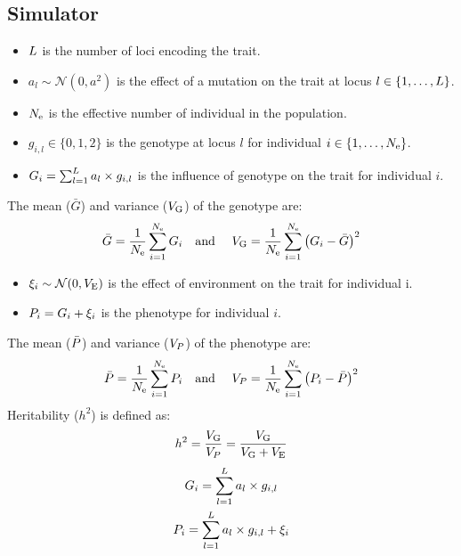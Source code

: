 \documentclass{article}
\begin{document}
\subsection{Simulator}
\begin{itemize}
    \setlength\itemsep{-0.2em}
    \item $L$ is the number of loci encoding the trait.
    \item $a_l \sim \mathcal{N}(0,a^2)$ is the effect of a mutation on the trait at locus $l \in \{1, \hdots, L\}$.
    \item $N_{\text{e}}$ is the effective number of individual in the population.
    \item $g_{i,l} \in \{0, 1, 2\}$ is the genotype at locus $l$ for individual $i \in \{1, \hdots, N_{\text{e}}\}$.
    \item $G_i = \sum_{l=1}^{L} a_l \times g_{i,l}$ is the influence of genotype on the trait for individual $i$.
\end{itemize}
The mean ($\bar{G}$) and variance ($V_{\mathrm{G}}$) of the genotype are:
\begin{equation}
    \bar{G} = \frac{1}{N_{\text{e}}}\sum_{i=1}^{N_{\text{e}}} G_i  \text{\quad and \quad}	V_{\mathrm{G}} = \frac{1}{N_{\text{e}}}\sum_{i=1}^{N_{\text{e}}}\left(G_i - \bar{G} \right)^2
\end{equation}
\begin{itemize}
    \setlength\itemsep{-0.2em}
    \item $\xi_i \sim \mathcal{N}(0, V_{\mathrm{E}})$ is the effect of environment on the trait for individual i.
    \item $P_i = G_i + \xi_i$ is the phenotype for individual $i$.
\end{itemize}
The mean ($\bar{P}$) and variance ($V_{P}$) of the phenotype are:
\begin{equation}
    \bar{P} = \frac{1}{N_{\text{e}}}\sum_{i=1}^{N_{\text{e}}} P_i \text{\quad and \quad} V_{P} = \frac{1}{N_{\text{e}}}\sum_{i=1}^{N_{\text{e}}}\left(P_i - \bar{P} \right)^2
\end{equation}
Heritability ($h^2$) is defined as:
\begin{equation}
    h^2 = \frac{V_{\mathrm{G}}}{V_{P}} = \frac{V_{\mathrm{G}}}{V_{\mathrm{G}} + V_{\mathrm{E}}}
\end{equation}
\begin{gather}
    G_i = \sum_{l=1}^{L} a_l \times g_{i,l} \\
    P_i = \sum_{l=1}^{L} a_l \times g_{i,l} + \xi_i
\end{gather}
\end{document}
